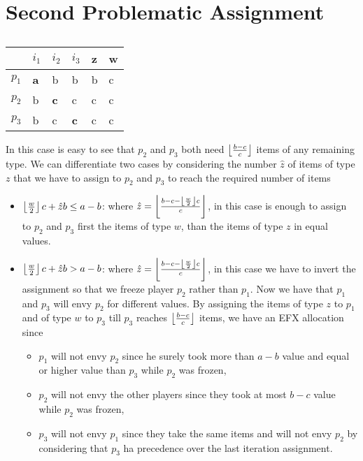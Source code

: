 \section{Second Problematic Assignment}
\begin{table}[h]
\centering
\begin{tabular}{|l|l|l|l||l|l|}
\hline
      & $i_1$           & $i_2$      & $i_3$        & z & w \\ \hline
$p_1$ & \textbf{a}      & b          & b            & b & c \\ \hline
$p_2$ & b               & \textbf{c} & c            & c & c \\ \hline
$p_3$ & b               & c          & \textbf{c}   & c & c \\ \hline
\end{tabular}
\caption{}
\label{table-3-players-abb-bcc-bcc}
\end{table}
In this case is easy to see that $p_2$ and $p_3$ both need $\left \lfloor\frac{b-c}{c}\right \rfloor$ items of any remaining type. We can differentiate two cases by considering the number $\hat z$ of items of type $z$ that we have to assign to $p_2$ and $p_3$ to reach the required number of items
\begin{itemize}
    \item $\left \lfloor\frac{w}{2}\right \rfloor c + \hat z b \le a-b$: where $\hat z = \left \lfloor\frac{b-c-\left \lfloor\frac{w}{2}\right \rfloor c}{c}\right \rfloor$, in this case is enough to assign to $p_2$ and $p_3$ first the items of type $w$, than the items of type $z$ in equal values.
    \item $\left \lfloor\frac{w}{2}\right \rfloor c + \hat z b > a-b$: where $\hat z = \left \lfloor\frac{b-c-\left \lfloor\frac{w}{2}\right \rfloor c}{c}\right \rfloor$, in this case we have to invert the assignment so that we freeze player $p_2$ rather than $p_1$. Now we have that $p_1$ and $p_3$ will envy $p_2$ for different values. By assigning the items of type $z$ to $p_1$ and of type $w$ to $p_3$ till $p_3$ reaches $\left \lfloor\frac{b-c}{c}\right \rfloor$ items, we have an EFX allocation since 
    \begin{itemize}
        \item $p_1$ will not envy $p_2$ since he surely took more than $a-b$ value and equal or higher value than $p_3$ while $p_2$ was frozen,
        \item $p_2$ will not envy the other players since they took at most $b-c$ value while $p_2$ was frozen,
        \item $p_3$ will not envy $p_1$ since they take the same items and will not envy $p_2$ by considering that $p_3$ ha precedence over the last iteration assignment.
    \end{itemize}
\end{itemize}


